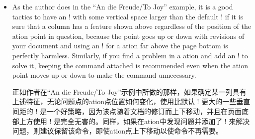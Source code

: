 \begin{description}
\begin{itemize}
\item
As the author does in the ``An die Freude/To Joy'' example, it is a good
tactics to have an \!\ensurevspace! with some vertical space larger than the
default \!\baselineskip! if it is sure that a column has a feature shown
above regardless of the position of the \sync{}ation point in question,
because the point goes up or down with revisions of your document and
using an \!\ensurevspace! for a \sync{}ation far above the page bottom is
perfectly harmless.  Similarly, if you find a problem in a \sync{}ation
and add an \!\ensurevspace! to solve it, keeping the command attached is
recommended even when the \sync{}ation point moves up or down to make the
command unnecessary.

正如作者在“An die Freude/To Joy”示例中所做的那样，如果确定某一列具有上述特征，无论问题点的\sync{}ation点位置如何变化，使用比默认
\!\baselineskip! 更大的一些垂直间距的 \!\ensurevspace! 是一个好策略，因为该点随着文档的修订而上下移动，并且在页面底部上方使用
\!\ensurevspace! 是完全无害的。同样，如果在\sync{}ation中发现问题并添加了 \!\ensurevspace! 来解决问题，则建议保留该命令，即使\sync{}ation点上下移动以使命令不再需要。

\end{itemize}
\end{description}

